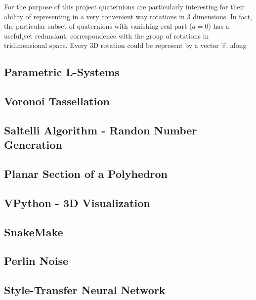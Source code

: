 For the purpose of this project quaternions are particularly interesting for their ability of representing in a very convenient way rotations in 3 dimensions. In fact, the particular subset of quaternions with vanishing real part ($a=0$) has a useful,yet redundant, correspondence with the group of rotations in tridimensional space. Every 3D rotation could be represent by a vector $\vec v$, along


\subsection{Parametric L-Systems}

\subsection{Voronoi Tassellation}

\subsection{Saltelli Algorithm - Randon Number Generation}

\subsection{Planar Section of a Polyhedron}

\subsection{VPython - 3D Visualization}

\subsection{SnakeMake}

\subsection{Perlin Noise}

\subsection{Style-Transfer Neural Network}\label{ssec:sttrNN}
